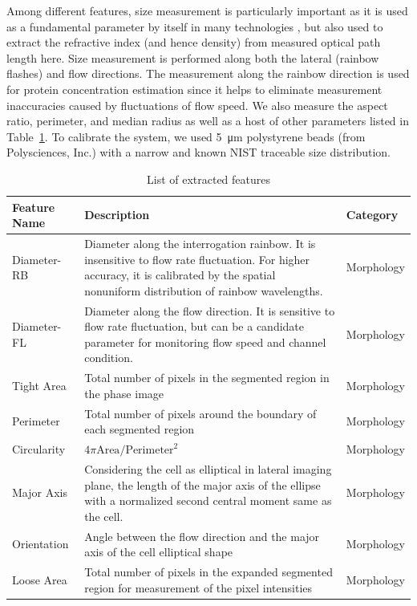 \documentclass[aps,pra,reprint,superscriptaddress]{revtex4-1}
\begin{document}
Among different features, size measurement is particularly important as it is used as a fundamental parameter by itself in many technologies \cite{}, but also used to extract the refractive index (and hence density) from measured optical path length here. Size measurement is performed along both the lateral (rainbow flashes) and flow directions. The measurement along the rainbow direction is used for protein concentration estimation since it helps to eliminate measurement inaccuracies caused by fluctuations of flow speed. We also measure the aspect ratio, perimeter, and median radius as well as a host of other parameters listed in Table~\ref{tbl:Features}. To calibrate the system, we used \SI{5}{\micro\meter} polystyrene beads (from Polysciences, Inc.) with a narrow and known NIST traceable size distribution.

\begin{table}
\caption{\label{tbl:Features} List of extracted features}
\begin{tabular}{|p{}|p{}|p{}|}
\hline
Feature Name	 &Description	 &Category\\ \hline
Diameter-RB	 &Diameter along the interrogation rainbow. It is insensitive to flow rate fluctuation. For higher accuracy, it is calibrated by the spatial nonuniform distribution of rainbow wavelengths. 	 &Morphology\\ \hline
Diameter-FL	 &Diameter along the flow direction. It is sensitive to flow rate fluctuation, but can be a candidate parameter for monitoring flow speed and channel condition.	 &Morphology\\ \hline
Tight Area	 &Total number of pixels in the segmented region in the phase image	 &Morphology\\ \hline
Perimeter	 &Total number of pixels around the boundary of each segmented region	 &Morphology\\ \hline
Circularity	 &$4\pi \text{Area} / \text{Perimeter}^2$  &Morphology\\ \hline
Major Axis 	 &Considering the cell as elliptical in lateral imaging plane, the length of the major axis of the ellipse with a normalized second central moment same as the cell.	 &Morphology\\ \hline
Orientation	 &Angle between the flow direction and the major axis of the cell elliptical shape	 &Morphology\\ \hline
Loose Area	 &Total number of pixels in the expanded segmented region for measurement of the pixel intensities	 &Morphology\\ \hline

\end{tabular}
\end{table}
\end{document}
